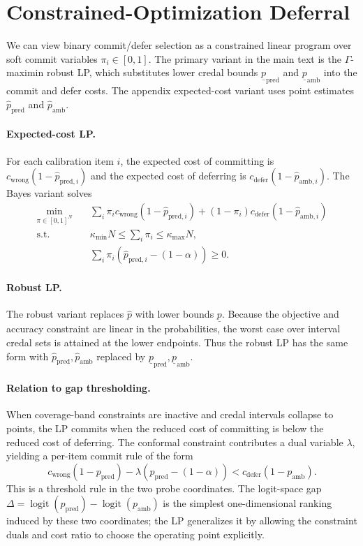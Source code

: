 \section{Constrained-Optimization Deferral}
\label{app:constrained-deferral}

We can view binary commit/defer selection as a constrained linear program over
soft commit variables $\pi_i \in [0,1]$. The primary variant in the main text is
the $\Gamma$-maximin robust LP, which substitutes lower credal bounds
$\underline p_{\mathrm{pred}}$ and $\underline p_{\mathrm{amb}}$ into the
commit and defer costs. The appendix expected-cost variant uses point estimates
$\hat p_{\mathrm{pred}}$ and $\hat p_{\mathrm{amb}}$.

\paragraph{Expected-cost LP.}
For each calibration item $i$, the expected cost of committing is
$c_{\mathrm{wrong}}(1-\hat p_{\mathrm{pred},i})$ and the expected cost of
deferring is $c_{\mathrm{defer}}(1-\hat p_{\mathrm{amb},i})$. The Bayes variant
solves
\[
\begin{aligned}
\min_{\pi \in [0,1]^N}\quad
&\sum_i \pi_i c_{\mathrm{wrong}}(1-\hat p_{\mathrm{pred},i})
 +(1-\pi_i)c_{\mathrm{defer}}(1-\hat p_{\mathrm{amb},i}) \\
\mathrm{s.t.}\quad
&\kappa_{\min}N \le \sum_i \pi_i \le \kappa_{\max}N,\\
&\sum_i \pi_i(\hat p_{\mathrm{pred},i}-(1-\alpha)) \ge 0.
\end{aligned}
\]

\paragraph{Robust LP.}
The robust variant replaces $\hat p$ with lower bounds
$\underline p$. Because the objective and accuracy constraint are linear in the
probabilities, the worst case over interval credal sets is attained at the lower
endpoints. Thus the robust LP has the same form with
$\hat p_{\mathrm{pred}}, \hat p_{\mathrm{amb}}$ replaced by
$\underline p_{\mathrm{pred}}, \underline p_{\mathrm{amb}}$.

\paragraph{Relation to gap thresholding.}
When coverage-band constraints are inactive and credal intervals collapse to
points, the LP commits when the reduced cost of committing is below the reduced
cost of deferring. The conformal constraint contributes a dual variable
$\lambda$, yielding a per-item commit rule of the form
\[
c_{\mathrm{wrong}}(1-p_{\mathrm{pred}})
-\lambda(p_{\mathrm{pred}}-(1-\alpha))
<
c_{\mathrm{defer}}(1-p_{\mathrm{amb}}).
\]
This is a threshold rule in the two probe coordinates. The logit-space gap
$\Delta=\operatorname{logit}(p_{\mathrm{pred}})
-\operatorname{logit}(p_{\mathrm{amb}})$ is the simplest one-dimensional
ranking induced by these two coordinates; the LP generalizes it by allowing the
constraint duals and cost ratio to choose the operating point explicitly.


